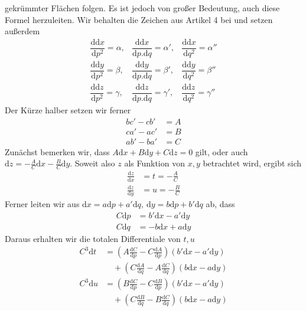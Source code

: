 %
gekrümmter Flächen folgen. Es ist jedoch von großer Bedeutung, auch diese Formel herzuleiten. Wir behalten die Zeichen aus Artikel 4 bei und setzen außerdem
\[
\begin{array}{lll}
\dfrac{\mathrm{d}\mathrm{d}x}{\mathrm{d}p^2}=\alpha,&\dfrac{\mathrm{d}\mathrm{d}x}{\mathrm{d}p\mathord{.}\mathrm{d}q}=\alpha',&\dfrac{\mathrm{d}\mathrm{d}x}{\mathrm{d}q^2}=\alpha''\\[6pt]
\dfrac{\mathrm{d}\mathrm{d}y}{\mathrm{d}p^2}=\beta,&\dfrac{\mathrm{d}\mathrm{d}y}{\mathrm{d}p\mathord{.}\mathrm{d}q}=\beta',&\dfrac{\mathrm{d}\mathrm{d}y}{\mathrm{d}q^2}=\beta''\\[6pt]
\dfrac{\mathrm{d}\mathrm{d}z}{\mathrm{d}p^2}=\gamma,&\dfrac{\mathrm{d}\mathrm{d}z}{\mathrm{d}p\mathord{.}\mathrm{d}q}=\gamma',&\dfrac{\mathrm{d}\mathrm{d}z}{\mathrm{d}q^2}=\gamma''
\end{array}
\]
Der Kürze halber setzen wir ferner
\[
\begin{aligned}
bc'-cb'&=A\\
ca'-ac'&=B\\
ab'-ba'&=C
\end{aligned}
\]
Zunächst bemerken wir, dass \(A\mathrm{d}x+B\mathrm{d}y+C\mathrm{d}z=0\) gilt, oder auch \(\mathrm{d}z=-\frac{A}{C}\mathrm{d}x-\frac{B}{C}\mathrm{d}y\). Soweit also \(z\) als Funktion von \(x,y\) betrachtet wird, ergibt sich
\[
\begin{aligned}
\frac{\mathrm{d}z}{\mathrm{d}x}&=t=-\frac{A}{C}\\
\frac{\mathrm{d}z}{\mathrm{d}y}&=u=-\frac{B}{C}
\end{aligned}
\]
Ferner leiten wir aus \(\mathrm{d}x=a\mathrm{d}p+a'\mathrm{d}q,\ \mathrm{d}y=b\mathrm{d}p+b'\mathrm{d}q\) ab, dass
\[
\begin{aligned}
C\mathrm{d}p&=b'\mathrm{d}x-a'\mathrm{d}y\\
C\mathrm{d}q&=-b\mathrm{d}x+a\mathrm{d}y
\end{aligned}
\]
Daraus erhalten wir die totalen Differentiale von \(t,u\)
\[
\begin{aligned}
C^3\mathrm{d}t&=(A\tfrac{\mathrm{d}C}{\mathrm{d}p}-C\tfrac{\mathrm{d}A}{\mathrm{d}p})(b'\mathrm{d}x-a'\mathrm{d}y)\\
&\quad +(C\tfrac{\mathrm{d}A}{\mathrm{d}q}-A\tfrac{\mathrm{d}C}{\mathrm{d}q})(b\mathrm{d}x-a\mathrm{d}y)\\
C^3\mathrm{d}u&=(B\tfrac{\mathrm{d}C}{\mathrm{d}p}-C\tfrac{\mathrm{d}B}{\mathrm{d}p})(b'\mathrm{d}x-a'\mathrm{d}y)\\
&\quad +(C\tfrac{\mathrm{d}B}{\mathrm{d}q}-B\tfrac{\mathrm{d}C}{\mathrm{d}q})(b\mathrm{d}x-a\mathrm{d}y)
\end{aligned}
\]
